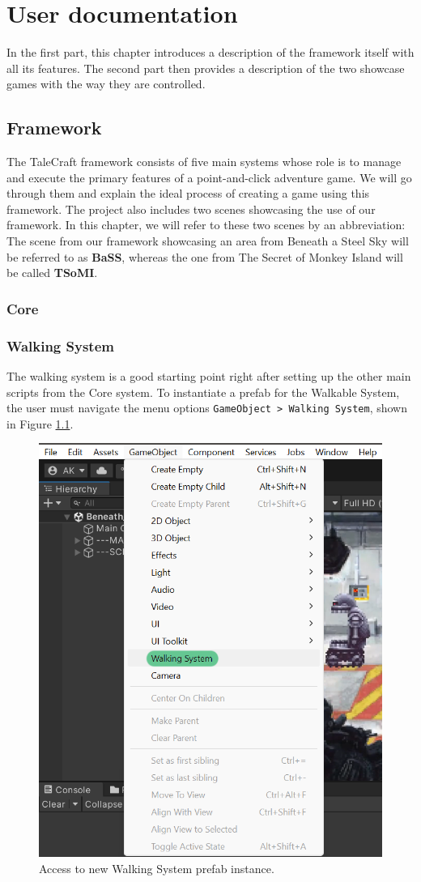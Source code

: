 \chapter{User documentation}
In the first part, this chapter introduces a description of the framework itself with all its features. The second part then provides a description of the two showcase games with the way they are controlled.  

\section{Framework}
The TaleCraft framework consists of five main systems whose role is to manage and execute the primary features of a point-and-click adventure game. We will go through them and explain the ideal process of creating a game using this framework. The project also includes two scenes showcasing the use of our framework. In this chapter, we will refer to these two scenes by an abbreviation: The scene from our framework showcasing an area from Beneath a Steel Sky will be referred to as \textbf{BaSS}, whereas the one from The Secret of Monkey Island will be called \textbf{TSoMI}.

\subsection{Core}

\subsection{Walking System}
The walking system is a good starting point right after setting up the other main scripts from the Core system. To instantiate a prefab for the Walkable System, the user must navigate the menu options \verb|GameObject > Walking System|, shown in Figure \ref{fig:Manual-WS}.
\begin{figure}[H]
\centering
\includegraphics[width=.5\linewidth]{img/User doc/walking_system.png}
\caption{Access to new Walking System prefab instance.}
\label{fig:Manual-WS}
\end{figure}

